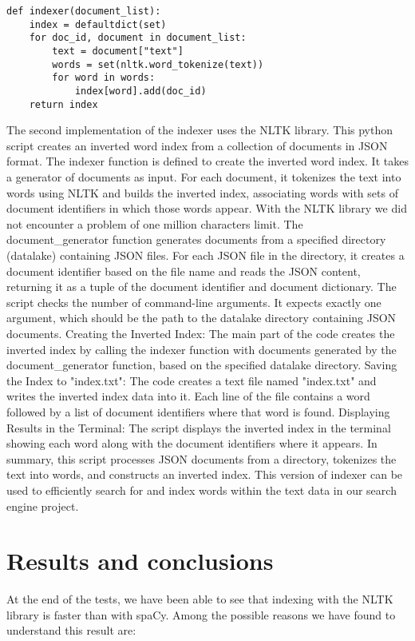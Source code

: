 \documentclass{article}
\begin{document}
\begin{verbatim}
def indexer(document_list):
	index = defaultdict(set)
	for doc_id, document in document_list:
		text = document["text"]
		words = set(nltk.word_tokenize(text))
		for word in words:
			index[word].add(doc_id)
	return index
\end{verbatim}

The second implementation of the indexer uses the NLTK library.
This python script creates an inverted word index
from a collection of documents in JSON format.
The indexer function is defined to create the inverted word index.
It takes a generator of documents as input. For each document,
it tokenizes the text into words using NLTK and builds the inverted index,
associating words with sets of document identifiers in which those words appear.
With the NLTK library we did not encounter a problem of one million characters limit.
The document\_generator function generates documents from a specified
directory (datalake) containing JSON files.
For each JSON file in the directory, it creates a document identifier
based on the file name and reads the JSON content,
returning it as a tuple of the document identifier and document dictionary.
The script checks the number of command-line arguments.
It expects exactly one argument, which should be the path to the datalake directory containing JSON documents.
Creating the Inverted Index:
The main part of the code creates the inverted index by
calling the indexer function with documents generated by
the document\_generator function, based on the specified datalake directory.
Saving the Index to "index.txt":
The code creates a text file named "index.txt" and writes the inverted
index data into it. Each line of the file contains a word
followed by a list of document identifiers where that word is found.
Displaying Results in the Terminal:
The script displays the inverted index in the terminal
showing each word along with the document identifiers where it appears.
In summary, this script processes JSON documents from a directory, tokenizes the text into words, and constructs an inverted index. This version of indexer can be used to efficiently search for and index words within the text data in our search engine project.

\section{Results and conclusions}
At the end of the tests, we have been able to see that indexing with the NLTK library is faster
than with spaCy. Among the possible reasons we have found to understand this result are:
\end{document}
